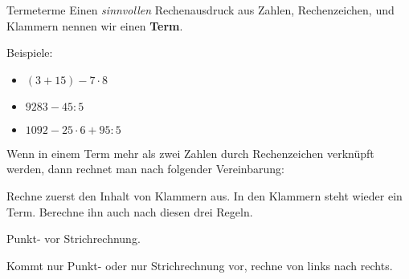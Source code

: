 \documentclass[lerntheke,12pt,a5paper,landscape]{arbeitsblatt}
\begin{document}
\begin{hilfekarte}{Terme}{terme}
	Einen \emph{sinnvollen} Rechenausdruck aus Zahlen, Rechenzeichen, und Klammern nennen wir einen \textbf{Term}.

	\medskip
	Beispiele:
	\begin{itemize}
		\item $(3 + 15) - 7\cdot 8$
		\item $9283 - 45 : 5$
		\item $1092 - 25\cdot 6 + 95 : 5$
	\end{itemize}

	Wenn in einem Term mehr als zwei Zahlen durch Rechenzeichen verknüpft werden, dann rechnet man nach folgender Vereinbarung:

	\begin{smallenum}
		\item Rechne zuerst den Inhalt von Klammern aus. In den Klammern steht wieder ein Term. Berechne ihn auch nach diesen drei Regeln.
		\item Punkt- vor Strichrechnung.
		\item Kommt nur Punkt- oder nur Strichrechnung vor, rechne von links nach rechts.
	\end{smallenum}
\end{hilfekarte}
\end{document}
